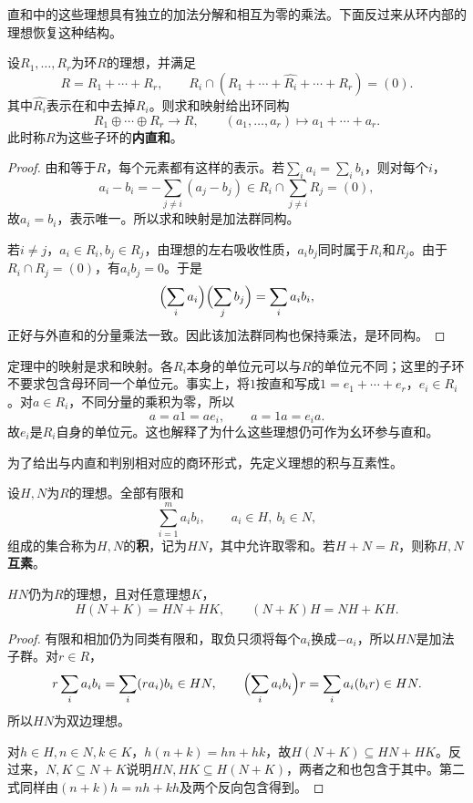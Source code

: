 直和中的这些理想具有独立的加法分解和相互为零的乘法。下面反过来从环内部的理想恢复这种结构。

\begin{theorem}\label{p2:concept:c3-ring-internal-sum}\label{p2:ring-internal-sum}
设$R_1,\ldots,R_r$为环$R$的理想，并满足
\[
R=R_1+\cdots+R_r,\qquad
R_i\cap(R_1+\cdots+\widehat{R_i}+\cdots+R_r)=(0).
\]
其中$\widehat{R_i}$表示在和中去掉$R_i$。则求和映射给出环同构
\[
R_1\oplus\cdots\oplus R_r\longrightarrow R,
\qquad(a_1,\ldots,a_r)\longmapsto a_1+\cdots+a_r.
\]
此时称$R$为这些子环的\textbf{内直和}。
\end{theorem}
\begin{proof}
由和等于$R$，每个元素都有这样的表示。若$\sum_i a_i=\sum_i b_i$，则对每个$i$，
\[
a_i-b_i=-\sum_{j\ne i}(a_j-b_j)
\in R_i\cap\sum_{j\ne i}R_j=(0),
\]
故$a_i=b_i$，表示唯一。所以求和映射是加法群同构。

若$i\ne j$，$a_i\in R_i,b_j\in R_j$，由理想的左右吸收性质，$a_ib_j$同时属于$R_i$和$R_j$。由于$R_i\cap R_j=(0)$，有$a_ib_j=0$。于是
\[
\Bigl(\sum_i a_i\Bigr)\Bigl(\sum_j b_j\Bigr)=\sum_i a_ib_i,
\]
正好与外直和的分量乘法一致。因此该加法群同构也保持乘法，是环同构。
\end{proof}

定理中的映射是求和映射。各$R_i$本身的单位元可以与$R$的单位元不同；这里的子环不要求包含母环同一个单位元。事实上，将$1$按直和写成$1=e_1+\cdots+e_r$，$e_i\in R_i$。对$a\in R_i$，不同分量的乘积为零，所以
\[
a=a1=ae_i,\qquad a=1a=e_i a.
\]
故$e_i$是$R_i$自身的单位元。这也解释了为什么这些理想仍可作为幺环参与直和。

为了给出与内直和判别相对应的商环形式，先定义理想的积与互素性。

\begin{definition}\label{p2:concept:c3-ideal-product}
设$H,N$为$R$的理想。全部有限和
\[
\sum_{i=1}^m a_ib_i,\qquad a_i\in H,\ b_i\in N,
\]
组成的集合称为$H,N$的\textbf{积}，记为$HN$，其中允许取零和。若$H+N=R$，则称$H,N$\textbf{互素}。
\end{definition}
\begin{proposition}
$HN$仍为$R$的理想，且对任意理想$K$，
\[
H(N+K)=HN+HK,\qquad(N+K)H=NH+KH.
\]
\end{proposition}
\begin{proof}
有限和相加仍为同类有限和，取负只须将每个$a_i$换成$-a_i$，所以$HN$是加法子群。对$r\in R$，
\[
r\sum_i a_ib_i=\sum_i(ra_i)b_i\in HN,
\qquad\Bigl(\sum_i a_ib_i\Bigr)r=\sum_i a_i(b_ir)\in HN.
\]
所以$HN$为双边理想。

对$h\in H,n\in N,k\in K$，$h(n+k)=hn+hk$，故$H(N+K)\subseteq HN+HK$。反过来，$N,K\subseteq N+K$说明$HN,HK\subseteq H(N+K)$，两者之和也包含于其中。第二式同样由$(n+k)h=nh+kh$及两个反向包含得到。
\end{proof}

